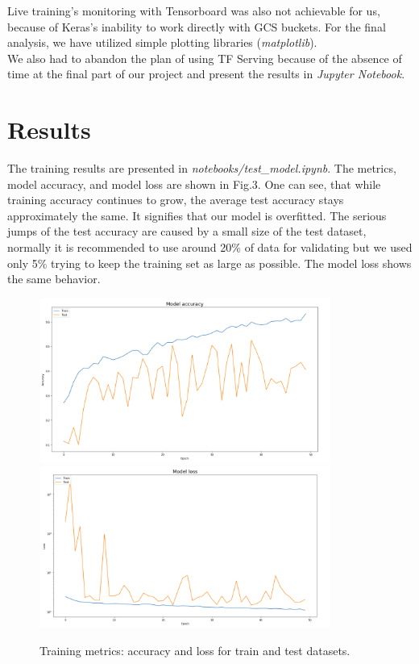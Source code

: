 \documentclass[
	12pt, %
]{fphw}
\begin{document}
Live training's monitoring with Tensorboard was also not achievable for us, because of Keras's inability to work directly with GCS buckets. For the final analysis, we have utilized simple plotting libraries (\textit{matplotlib}).\\

We also had to abandon the plan of using TF Serving because of the absence of time at the final part of our project and present the results in \textit{Jupyter Notebook}.

\pagebreak
\section{Results}

The training results are presented in \textit{notebooks/test\_model.ipynb}. The metrics, model accuracy, and model loss are shown in Fig.3. One can see, that while training accuracy continues to grow, the average test accuracy stays approximately the same. It signifies that our model is overfitted. The serious jumps of the test accuracy are caused by a small size of the test dataset, normally it is recommended to use around 20\% of data for validating but we used only 5\% trying to keep the training set as large as possible. The model loss shows the same behavior.\\

\begin{figure}[H]
	\center \includegraphics[width=0.85\textwidth]{model_acc}
	\center \includegraphics[width=0.85\textwidth]{model_loss}
	\caption{Training metrics: accuracy and loss for train and test datasets.}
\end{figure}
\end{document}

